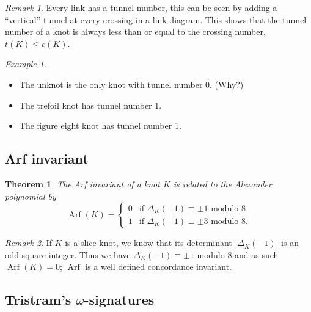 \documentclass[nobib]{tufte-book} %
\newtheorem{theorem}{Theorem}
\theoremstyle{definition}
\theoremstyle{remark}
\newtheorem{remark}{Remark}
\newtheorem{example}{Example}
\DeclareMathOperator{\Arf}{Arf}
\begin{document}
\begin{remark}
	Every link has a tunnel number, this can be seen by adding a ``vertical''
	tunnel at every crossing in a link diagram.
	This shows that the tunnel number of a knot is always less than or equal
	to the crossing number, $t(K) \le c(K)$.
\end{remark}

\begin{example}
	\begin{itemize}
		\item The unknot is the only knot with tunnel number 0. (Why?)
		\item The trefoil knot has tunnel number 1.
		\item The figure eight knot has tunnel number 1.
	\end{itemize}
\end{example}



\subsection{Arf invariant}

\begin{theorem}
	The Arf invariant of a knot $K$ is related to the Alexander polynomial by
	\begin{equation*}
		\Arf(K) =
		\begin{cases}
			0 & \textrm{if } \Delta_{K}(-1) \equiv \pm 1 \textrm{ modulo } 8 \\
			1 & \textrm{if } \Delta_{K}(-1) \equiv \pm 3 \textrm{ modulo } 8.
		\end{cases}
	\end{equation*}
\end{theorem}

\begin{remark}
	If $K$ is a slice knot, we know that its determinant
	$| \Delta_{K}(-1) |$ is an odd square integer.
	Thus we have $\Delta_{K}(-1) \equiv \pm 1 \textrm{ modulo } 8$
	and as such $\Arf(K) = 0$; $\Arf$ is a well defined concordance invariant.
\end{remark}


\subsection{Tristram's $\omega$-signatures}
\end{document}
